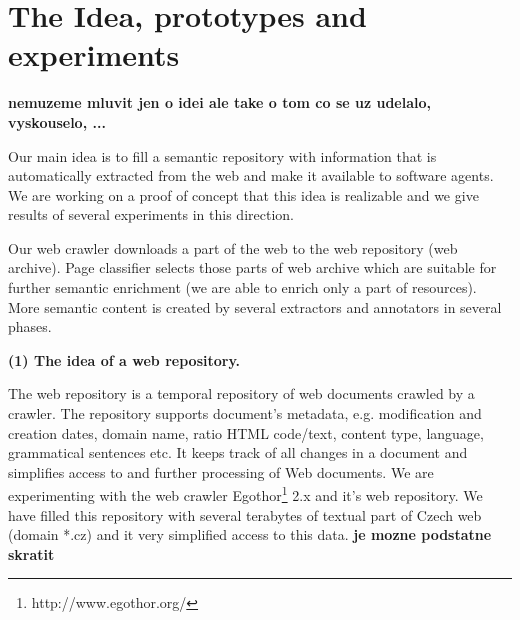 \documentclass{www2009-submission}
\begin{document}
\section{The Idea, prototypes and experiments}


{\bf nemuzeme mluvit jen o idei ale take o tom co se uz udelalo, vyskouselo, ...}

Our main idea is to fill a semantic repository with information that is automatically extracted from the web and make it available to software agents. We are working on a proof of concept that this idea is realizable and we give results of several experiments in this direction.

Our web crawler %
downloads a part of the web to the web repository (web archive). 
Page classifier selects those parts of web archive which are suitable for further semantic enrichment (we are able to enrich only a part of resources). More semantic content is created by several extractors and annotators in several phases. %



\textbf{(1) The idea of a web repository.}  



The web repository is a temporal repository of web documents crawled by a crawler. The repository supports document's metadata, e.g. modification and creation dates, domain name, ratio HTML code/text, content type, language, grammatical sentences etc. It keeps track of all changes in a document and simplifies access to and further processing of Web documents. We are experimenting with the web crawler Egothor\footnote{http://www.egothor.org/} 2.x and it's web repository. We have filled this repository with several terabytes of textual part of Czech web (domain *.cz) and it very simplified access to this data. {\bf je mozne podstatne skratit}
\end{document}
